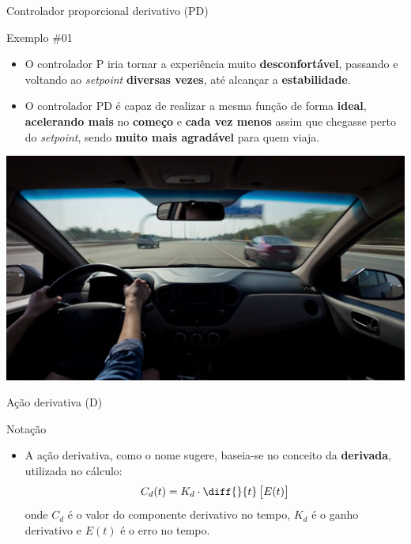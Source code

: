\begin{frame}{Controlador proporcional derivativo (PD)}
	\begin{block}{Exemplo \#01}
		\begin{itemize}
			\item O controlador P iria tornar a experiência muito \textbf{desconfortável}, passando e voltando ao \textit{setpoint} \textbf{diversas vezes}, até alcançar a \textbf{estabilidade}.
			\item O controlador PD é capaz de realizar a mesma função de forma \textbf{ideal}, \textbf{acelerando mais} no \textbf{começo} e \textbf{cada vez menos} assim que chegasse perto do \textit{setpoint}, sendo \textbf{muito mais agradável} para quem viaja.
		\end{itemize}
	\end{block}
	
	
	\centering
	\includegraphics[height=0.45\textheight]{Figuras/Ch12/fig9}
	
\end{frame}


\begin{frame}{Ação derivativa (D)}
	\begin{block}{Notação}
		\begin{itemize}
			\item A ação derivativa, como o nome sugere, baseia-se no conceito da \textbf{derivada}, utilizada no cálculo:\[ C_d(t)=K_d\cdot\diff{}{t}\sbr{E(t)} \]
			onde $ C_d $ é o valor do componente derivativo no tempo, $ K_d $ é o ganho derivativo e $ E(t) $ é o erro no tempo.
		\end{itemize}
	\end{block}
\end{frame}


